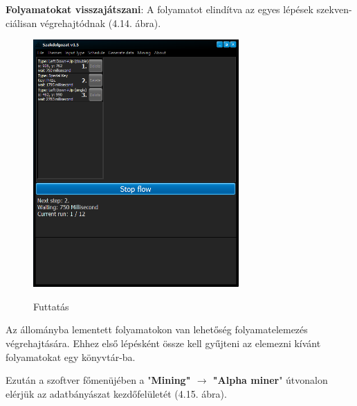 \begin{enumerate}
{		\textbf{Folyamatokat visszajátszani}: A folyamatot elindítva az egyes lépések szekven\hyp{}ciálisan végrehajtódnak (4.14. ábra).
		\begin{figure}[h!]
			\begin{center}
				\includegraphics[width=0.7\textwidth, keepaspectratio=true]{images/img_flow_run}\\
				\caption{Futtatás}
				\label{fig:example}
			\end{center}
		\end{figure}
	}

\end{enumerate}


Az állományba lementett folyamatokon van lehetőség folyamatelemezés végrehajtására. Ehhez első lépésként össze kell gyűjteni az elemezni kívánt folyamatokat egy könyvtár\hyp{}ba.

Ezután a szoftver főmenüjében a "\textbf{Mining" $\rightarrow$ "Alpha miner}" útvonalon elérjük az adatbányászat kezdőfelületét (4.15. ábra).

